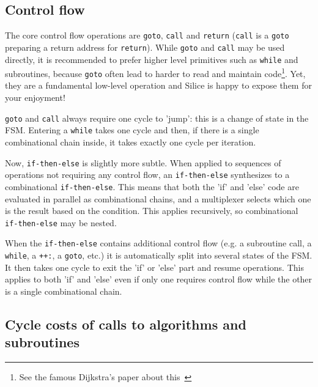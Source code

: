 \documentclass[a4]{article}
\newcommand\silice{Silice}
\begin{document}

\subsection{Control flow}

The core control flow operations are \texttt{goto}, \texttt{call} and \texttt{return} (\texttt{call} is a \texttt{goto} preparing a return address for \texttt{return}). 
%
While \texttt{goto} and \texttt{call} may be used directly, it is recommended to prefer higher level primitives such as \texttt{while} and subroutines, because \texttt{goto} often lead to harder to read and maintain code\footnote{See the famous Dijkstra's paper about this~\cite{dijkstra}}. Yet, they are a fundamental low-level operation and \silice{} is happy to expose them for your enjoyment!

\texttt{goto} and \texttt{call} always require one cycle to 'jump': this is a change of state in the FSM. Entering a \texttt{while} takes one cycle and then, if there is a single combinational chain inside, it takes exactly one cycle per iteration. 

Now, \texttt{if-then-else} is slightly more subtle. When applied to sequences of operations not requiring any control flow, an \texttt{if-then-else} synthesizes to a combinational \texttt{if-then-else}. This means that both the 'if' and 'else' code are evaluated in parallel as combinational chains, and a multiplexer selects which one is the result based on the condition. This applies recursively, so combinational \texttt{if-then-else} may be nested.

When the \texttt{if-then-else} contains additional control flow (e.g. a subroutine call, a \texttt{while}, a \texttt{++:}, a \texttt{goto}, etc.) it is automatically split into several states of the FSM. It then takes one cycle to exit the 'if' or 'else' part and resume operations. This applies to both 'if' and 'else' even if only one requires control flow while the other is a single combinational chain.


\subsection{Cycle costs of calls to algorithms and subroutines}



\end{document}
